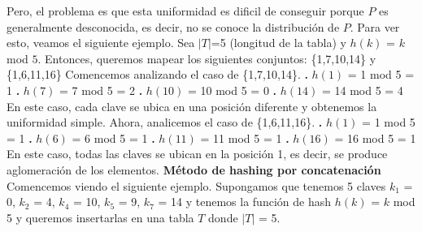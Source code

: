 \documentclass[10pt,a4paper]{article}
\begin{document}
\newline
\newline
Pero, el problema es que esta uniformidad es dificil de conseguir porque $P$ es generalmente desconocida, es decir, no se conoce la distribución de $P$. 
\newline
\newline
Para ver esto, veamos el siguiente ejemplo.
\newline
\newline
Sea $|$$T$$|$=5 (longitud de la tabla) y $h(k)$ = $k$ mod $5$. Entonces, queremos mapear los siguientes conjuntos: \{1,7,10,14\} y \{1,6,11,16\} 
\newline
\newline
Comencemos analizando el caso de \{1,7,10,14\}.
\newline
\newline
\textbf{.} $h(1)$ = 1 mod 5 = 1
\newline
\newline
\textbf{.} $h(7)$ = 7 mod 5 = 2
\newline
\newline
\textbf{.} $h(10)$ = 10 mod 5 = 0
\newline
\newline
\textbf{.} $h(14)$ = 14 mod 5 = 4
\newline
\newline
En este caso, cada clave se ubica en una posición diferente y obtenemos la uniformidad simple.
\newpage
Ahora, analicemos el caso de \{1,6,11,16\}.
\newline
\newline
\textbf{.} $h(1)$ = 1 mod 5 = 1
\newline
\newline
\textbf{.} $h(6)$ = 6 mod 5 = 1
\newline
\newline
\textbf{.} $h(11)$ = 11 mod 5 = 1
\newline
\newline
\textbf{.} $h(16)$ = 16 mod 5 = 1
\newline
\newline
En este caso, todas las claves se ubican en la posición 1, es decir, se produce aglomeración de los elementos.
\newline
\newline
\textbf{Método de hashing por concatenación}
\newline
\newline
Comencemos viendo el siguiente ejemplo. Supongamos que tenemos 5 claves $k_{1}$ = 0, $k_{2}$ = 4, $k_{4}$ = 10, $k_{5}$ = 9, $k_{7}$ = 14 y tenemos la función de hash $h(k)$ = $k$ mod 5 y queremos insertarlas en una tabla $T$ donde $|$$T$$|$ = 5.
\end{document}
